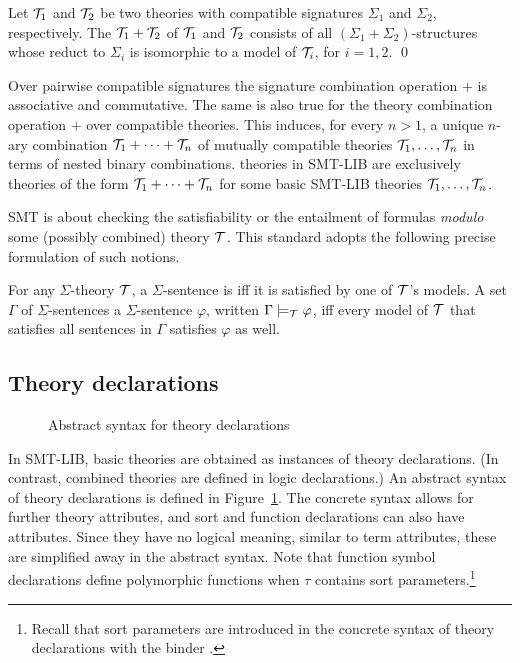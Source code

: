 \begin{definition}
\label{def:theorycomb}
Let $\mathcal{T}_1$ and $\mathcal{T}_2$ be two theories 
with compatible signatures $\Sigma_1$ and $\Sigma_2$, respectively. 
The  $\mathcal{T}_1 + \mathcal{T}_2$ of $\mathcal{T}_1$ and $\mathcal{T}_2$
consists of all $(\Sigma_1+\Sigma_2)$-structures
whose reduct to $\Sigma_i$ is isomorphic to a model of $\mathcal{T}_i$,
for $i=1,2$.
\qed
\end{definition}

Over pairwise compatible signatures
the signature combination operation $+$ is associative and commutative.
The same is also true for the theory combination operation $+$ over
compatible theories.
This induces, for every $n > 1$,
a unique $n$-ary combination $\mathcal{T}_1 + \cdots + \mathcal{T}_n$ 
of mutually compatible theories $\mathcal{T}_1,\ldots,\mathcal{T}_n$
in terms of nested binary combinations.
 theories in SMT-LIB are exclusively
theories of the form $\mathcal{T}_1 + \cdots + \mathcal{T}_n$ 
for some basic SMT-LIB theories $\mathcal{T}_1,\ldots,\mathcal{T}_n$.

SMT is about checking the satisfiability or the entailment 
of formulas \emph{modulo} some (possibly combined) theory $\mathcal{T}$.
This standard adopts the following precise formulation of such notions.

\begin{definition}
For any $\Sigma$-theory $\mathcal{T}$,
a $\Sigma$-sentence is 
iff it is satisfied by one of $\mathcal{T}$'s models.
A set $\Gamma$ of $\Sigma$-sentences
 a $\Sigma$-sentence $\varphi$,
written $\Gamma \models_{\mathcal{T}} \varphi$,
iff every model of $\mathcal{T}$ that satisfies all sentences in $\Gamma$
satisfies $\varphi$ as well.
\end{definition}


\subsection{Theory declarations} \label{sec:theory-decl}

\begin{figure}[t]
\theories
\caption{Abstract syntax for theory declarations}
\label{fig:theory-declaration}
\end{figure}

In SMT-LIB, basic theories are obtained as instances of theory declarations.
(In contrast, combined theories are defined in logic declarations.)
An abstract syntax of theory declarations is defined in 
Figure~\ref{fig:theory-declaration}.
The concrete syntax allows for further
theory attributes, and sort and function declarations can also have
attributes.  Since they have no logical meaning, similar to term attributes,
these are simplified away in the abstract syntax.  Note that function symbol
declarations define polymorphic functions
when $\tau$ contains sort parameters.\footnote{%
Recall that sort parameters are introduced
in the concrete syntax of theory declarations with the binder .
}

